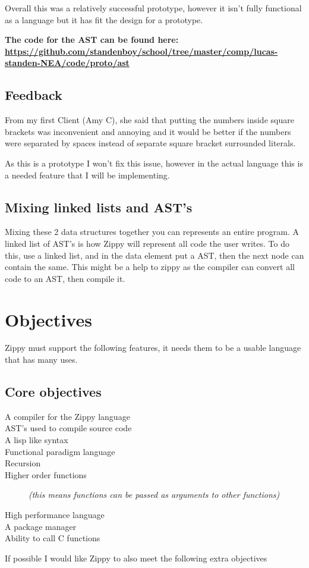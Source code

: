 \documentclass[a4paper,12pt]{article}
\begin{document}
{Overall this was a relatively successful prototype, however it isn't fully functional 
as a language but it has fit the design for a prototype.

\textbf{The code for the AST can be found here:
\url{https://github.com/standenboy/school/tree/master/comp/lucas-standen-NEA/code/proto/ast}}

\subsection{Feedback}
From my first Client (Amy C), she said that putting the numbers inside square brackets 
was inconvenient and annoying and it would be better if the numbers were separated
by spaces instead of separate square bracket surrounded literals.

As this is a prototype I won't fix this issue, however in the actual language this is 
a needed feature that I will be implementing.

\subsection{Mixing linked lists and AST's}
Mixing these 2 data structures together you can represents an entire program. A linked 
list of AST's is how Zippy will represent all code the user writes. To do this, use a 
linked list, and in the data element put a AST, then the next node can contain the same. 
This might be a help to zippy as the compiler can convert all code to an AST, then 
compile it.
}
\section{Objectives}
Zippy must support the following features, it needs them to be a usable language that has 
many uses.
\subsection{Core objectives}
\begin{description}
	\item[A compiler for the Zippy language]
	\item[AST's used to compile source code]
	\item[A lisp like syntax]
	\item[Functional paradigm language]
	\item[Recursion]
	\item[Higher order functions] \textit{(this means functions can be passed as arguments to 
		other functions)}
	\item[High performance language]
	\item[A package manager]
	\item[Ability to call C functions]
\end{description}
If possible I would like Zippy to also meet the following extra objectives
\end{document}
